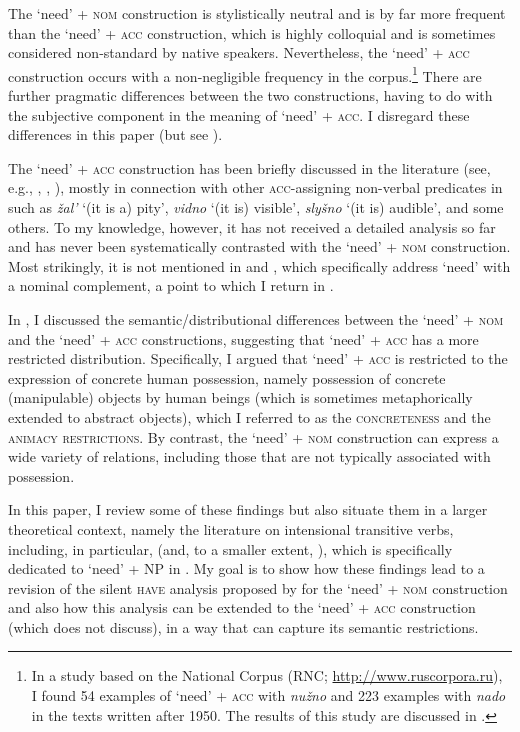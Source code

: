 \documentclass[output=paper,colorlinks,citecolor=brown]{langscibook}
\begin{document}
\noindent The `need' + \textsc{nom} construction is stylistically neutral and is by far more frequent than the `need' + \textsc{acc} construction, which is highly colloquial and is sometimes considered non-standard by native speakers. Nevertheless, the `need' + \textsc{acc} construction occurs with a non-negligible frequency in the corpus.\footnote{In a study based on the  National Corpus (RNC; \url{http://www.ruscorpora.ru}), I found 54 examples of `need' + \textsc{acc} with \textit{nužno} and 223 examples with \textit{nado} in the texts written after 1950. The results of this study are discussed in \citealt{Knyazev2020}.} There are further pragmatic differences between the two constructions, having to do with the subjective component in the meaning of `need' + \textsc{acc}. I disregard these differences in this paper (but see \citealt{Knyazev2020}).

The `need' + \textsc{acc} construction has been briefly discussed in the literature (see, e.g., \citealt[325--327]{Svedova1980}, \citealt[213]{Pesetsky1982}, \citealt[28]{Mikaelian.Roudet1999}), mostly in connection with other \textsc{acc}-assigning non-verbal predicates in  such as \textit{žal'} `(it is a) pity', \textit{vidno} `(it is) visible', \textit{slyšno} `(it is) audible', and some others. To my knowledge, however, it has not received a detailed analysis so far and has never been systematically contrasted with the `need' + \textsc{nom} construction. Most strikingly, it is not mentioned in \citet{Harves2008} and \citet{Harves.Kayne2012}, which specifically address  `need' with a nominal complement, a point to which I return in .

In \citet{Knyazev2020}, I discussed the semantic/distributional differences between the `need' + \textsc{nom} and the `need' + \textsc{acc} constructions, suggesting that `need' + \textsc{acc} has a more restricted distribution. Specifically, I argued that `need' + \textsc{acc} is restricted to the expression of concrete human possession, namely possession of concrete (manipulable) objects by human beings (which is sometimes metaphorically extended to abstract objects), which I referred to as the \textsc{concreteness} and the \textsc{animacy restrictions}. By contrast, the `need' + \textsc{nom} construction can express a wide variety of relations, including those that are not typically associated with possession.

In this paper, I review some of these findings but also situate them in a larger theoretical context, namely the literature on intensional transitive verbs, including, in particular, \citet{Harves2008} (and, to a smaller extent, \citealt{Harves.Kayne2012}), which is specifically dedicated to `need' + NP in . My goal is to show how these findings lead to a revision of the silent \textsc{have} analysis proposed by \citet{Harves2008} for the `need' + \textsc{nom} construction and also how this analysis can be extended to the `need' + \textsc{acc} construction (which \citeauthor{Harves2008} does not discuss), in a way that can capture its semantic restrictions.
\end{document}
